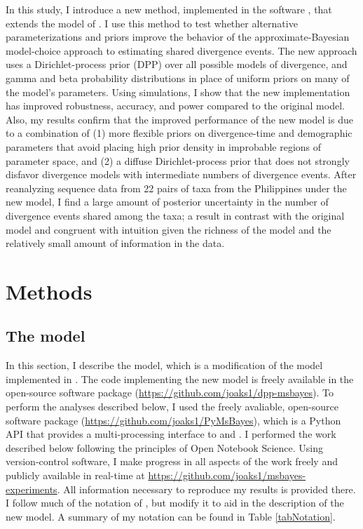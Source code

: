 In this study, I introduce a new method, implemented in the software
\dppmsbayes, that extends the model of \msb.
I use this method to test whether alternative parameterizations and priors
improve the behavior of the approximate-Bayesian model-choice approach to
estimating shared divergence events.
The new approach uses a Dirichlet-process prior (DPP) over all possible models
of divergence, and gamma and beta probability distributions in place of uniform
priors on many of the model's parameters.
Using simulations, I show that the new implementation has improved robustness,
accuracy, and power compared to the original model.
Also, my results confirm that the improved performance of the new model
is due to a combination of
(1) more flexible priors on divergence-time and demographic parameters that
avoid placing high prior density in improbable regions of parameter space, and
(2) a diffuse Dirichlet-process prior that does not strongly disfavor
divergence models with intermediate numbers of divergence events.
After reanalyzing sequence data from 22 pairs of taxa from the Philippines
\cite{Oaks2012} under the new model, I find a large amount of posterior
uncertainty in the number of divergence events shared among the taxa; a result
in contrast with the original \msb model and congruent with
intuition given the richness of the model and the relatively small amount of
information in the data.


\section{Methods}

\subsection{The model}
In this section, I describe the model, which is a modification of the model
implemented in \msb \cite{Huang2011,Oaks2012}.
The code implementing the new model is freely available in the open-source
software package \dppmsbayes
(\href{https://github.com/joaks1/dpp-msbayes}{\url{https://github.com/joaks1/dpp-msbayes}}).
To perform the analyses described below, I used the freely avaliable,
open-source software package \pymsbayes
(\href{https://github.com/joaks1/PyMsBayes}{\url{https://github.com/joaks1/PyMsBayes}}),
which is a Python API that provides a multi-processing interface to \msb and
\dppmsbayes.
I performed the work described below following the principles of
Open Notebook Science.
Using version-control software, I make progress in all aspects of the work
freely and publicly available in real-time at
\href{https://github.com/joaks1/msbayes-experiments}{\url{https://github.com/joaks1/msbayes-experiments}}.
All information necessary to reproduce my results is provided there.
I follow much of the notation of \cite{Oaks2012}, but modify it to
aid in the description of the new model.
A summary of my notation can be found in Table \ref{tabNotation}.

